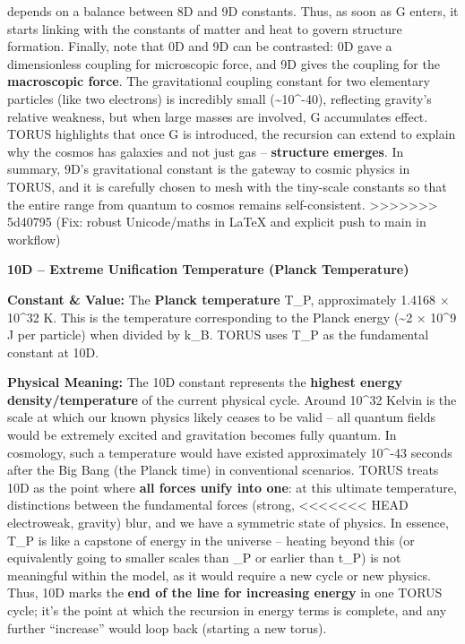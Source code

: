 \documentclass[]{article}
\begin{document}
depends on a balance between 8D and 9D constants. Thus, as soon as G
enters, it starts linking with the constants of matter and heat to
govern structure formation. Finally, note that 0D and 9D can be
contrasted: 0D gave a dimensionless coupling for microscopic force, and
9D gives the coupling for the \textbf{macroscopic force}. The
gravitational coupling constant for two elementary particles (like two
electrons) is incredibly small (\textasciitilde{}10\^{}-40), reflecting
gravity's relative weakness, but when large masses are involved, G
accumulates effect. TORUS highlights that once G is introduced, the
recursion can extend to explain why the cosmos has galaxies and not just
gas -- \textbf{structure emerges}. In summary, 9D's gravitational
constant is the gateway to cosmic physics in TORUS, and it is carefully
chosen to mesh with the tiny-scale constants so that the entire range
from quantum to cosmos remains self-consistent.
>>>>>>> 5d40795 (Fix: robust Unicode/maths in LaTeX and explicit push to main in workflow)

\textbf{10D -- Extreme Unification Temperature (Planck Temperature)}

\textbf{Constant \& Value:} The \textbf{Planck temperature} T\_P,
approximately 1.4168 × 10\^{}32 K​. This is the temperature
corresponding to the Planck energy (\textasciitilde{}2 × 10\^{}9 J per
particle) when divided by k\_B. TORUS uses T\_P as the fundamental
constant at 10D.

\textbf{Physical Meaning:} The 10D constant represents the
\textbf{highest energy density/temperature} of the current physical
cycle. Around 10\^{}32 Kelvin is the scale at which our known physics
likely ceases to be valid -- all quantum fields would be extremely
excited and gravitation becomes fully quantum. In cosmology, such a
temperature would have existed approximately 10\^{}-43 seconds after the
Big Bang (the Planck time) in conventional scenarios. TORUS treats 10D
as the point where \textbf{all forces unify into one}: at this ultimate
temperature, distinctions between the fundamental forces (strong,
<<<<<<< HEAD
electroweak, gravity) blur, and we have a symmetric state of
physics\hspace{0pt}. In essence, T\_P is like a capstone of energy in
the universe -- heating beyond this (or equivalently going to smaller
scales than \ell\_P or earlier than t\_P) is not meaningful within the
model, as it would require a new cycle or new physics. Thus, 10D marks
the \textbf{end of the line for increasing energy} in one TORUS cycle;
it's the point at which the recursion in energy terms is complete, and
any further ``increase'' would loop back (starting a new torus).
\end{document}
